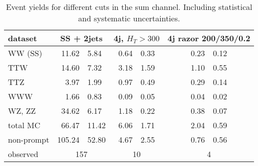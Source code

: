 \begin{table}
    \centering
    \begin{tabular}{l *3{r@{$\pm$}l}}
        \toprule
        dataset & \multicolumn{2}{c}{SS + 2jets}& \multicolumn{2}{c}{4j, $H_T >
        300$}& \multicolumn{2}{c}{4j razor 200/350/0.2} \\
        \midrule
        WW (SS)& 11.62 & 5.84& 0.64 & 0.33& 0.23 & 0.12\\
        TTW& 14.60 & 7.32& 3.18 & 1.59& 1.10 & 0.55\\
        TTZ& 3.97 & 1.99& 0.97 & 0.49& 0.29 & 0.14\\
        WWW& 1.66 & 0.83& 0.09 & 0.05& 0.04 & 0.02\\
        WZ, ZZ& 34.62 & 6.17& 1.18 & 0.22& 0.38 & 0.07\\
        total MC& 66.47 & 11.42& 6.06 & 1.71& 2.04 & 0.59\\
        non-prompt & 105.24 & 52.80& 4.67 & 2.55& 0.76 & 0.56\\
        observed & \multicolumn{2}{c}{157}& \multicolumn{2}{c}{10}& \multicolumn{2}{c}{4} \\
        \bottomrule
    \end{tabular}
    \caption{Event yields for different cuts in the sum channel. Including
    statistical and systematic uncertainties.}
\end{table}

